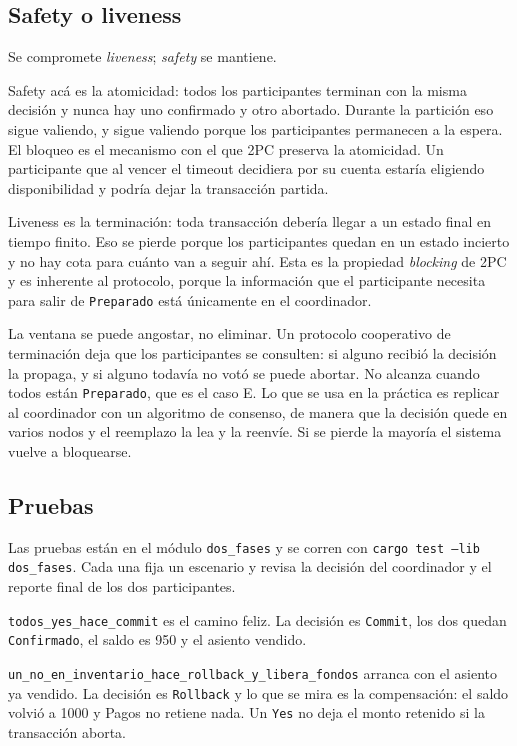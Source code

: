 \subsection{Safety o liveness}

Se compromete \emph{liveness}; \emph{safety} se mantiene.

Safety acá es la atomicidad: todos los participantes terminan con la misma
decisión y nunca hay uno confirmado y otro abortado. Durante la partición
eso sigue valiendo, y sigue valiendo porque los participantes permanecen a
la espera. El bloqueo es el mecanismo con el que 2PC preserva la atomicidad.
Un participante que al vencer el timeout decidiera por su cuenta estaría
eligiendo disponibilidad y podría dejar la transacción partida.

Liveness es la terminación: toda transacción debería llegar a un estado
final en tiempo finito. Eso se pierde porque los participantes quedan en un
estado incierto y no hay cota para cuánto van a seguir ahí. Esta es la propiedad
\emph{blocking} de 2PC y es inherente al protocolo, porque la información
que el participante necesita para salir de \texttt{Preparado} está
únicamente en el coordinador.

La ventana se puede angostar, no eliminar. Un protocolo cooperativo de
terminación deja que los participantes se consulten: si alguno recibió la
decisión la propaga, y si alguno todavía no votó se puede abortar. No
alcanza cuando todos están \texttt{Preparado}, que es el caso E. Lo que se
usa en la práctica es replicar al coordinador con un algoritmo de consenso,
de manera que la decisión quede en varios nodos y el reemplazo la lea y la
reenvíe. Si se pierde la mayoría el sistema vuelve a bloquearse.

\subsection{Pruebas}

Las pruebas están en el módulo \texttt{dos\_fases} y se corren con
\texttt{cargo test --lib dos\_fases}. Cada una fija un escenario y revisa la
decisión del coordinador y el reporte final de los dos participantes.

\texttt{todos\_yes\_hace\_commit} es el camino feliz. La decisión es
\texttt{Commit}, los dos quedan \texttt{Confirmado}, el saldo es 950 y el
asiento vendido.

\texttt{un\_no\_en\_inventario\_hace\_rollback\_y\_libera\_fondos} arranca
con el asiento ya vendido. La decisión es \texttt{Rollback} y lo que se mira
es la compensación: el saldo volvió a 1000 y Pagos no retiene nada. Un
\texttt{Yes} no deja el monto retenido si la transacción aborta.

